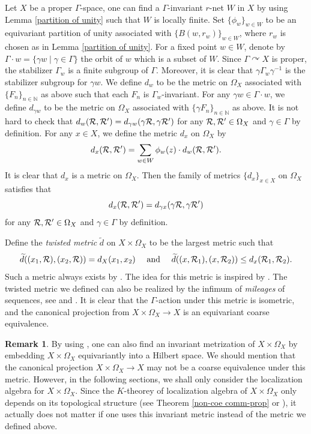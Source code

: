 \documentclass[11pt]{article}
\theoremstyle{definition}
\newtheorem{Rem}[Def]{Remark}
\theoremstyle{plain}
\def\IN{\mathbb N}\def\IR{\mathbb R}\def\IE{\mathbb E}\def\IC{\mathbb C}\def\IL{\mathbb L}\def\IQ{\mathbb Q}\def\IA{\mathbb A}\def\IZ{\mathbb Z}
\def\wt{\widetilde}
\def\Ga{\Gamma}
\def\car{\curvearrowright}
\begin{document}
Let $X$ be a proper $\Ga$-space, one can find a $\Ga$-invariant $r$-net $W$ in $X$ by using Lemma \ref{partition of unity} such that $W$ is locally finite. Set $\{\phi_w\}_{w\in W}$ to be an equivariant partition of unity associated with $\{B(w,r_w)\}_{w\in W}$, where $r_w$ is chosen as in Lemma \ref{partition of unity}. For a fixed point $w\in W$, denote by $\Ga\cdot w=\{\gamma w\mid \gamma\in\Ga\}$ the orbit of $w$ which is a subset of $W$. Since $\Ga\car X$ is proper, the stabilizer $\Ga_w$ is a finite subgroup of $\Ga$. Moreover, it is clear that $\gamma\Ga_w\gamma^{-1}$ is the stabilizer subgroup for $\gamma w$. We define $d_w$ to be the metric on $\Omega_X$ associated with $\{F_n\}_{n\in\IN}$ as above such that each $F_n$ is $\Ga_w$-invariant. For any $\gamma w\in\Ga\cdot w$, we define $d_{\gamma w}$ to be the metric on $\Omega_X$ associated with $\{\gamma F_n\}_{n\in\IN}$ as above. It is not hard to check that $d_w(\mathcal R,\mathcal R')=d_{\gamma w}(\gamma\mathcal R,\gamma\mathcal R')$ for any $\mathcal R,\mathcal R'\in\Omega_X$ and $\gamma\in\Ga$ by definition. For any $x\in X$, we define the metric $d_x$ on $\Omega_{X}$ by
$$d_x(\mathcal R,\mathcal R')=\sum_{w\in W}\phi_w(z)\cdot d_w(\mathcal R,\mathcal R').$$
It is clear that $d_x$ is a metric on $\Omega_X$. Then the family of metrics $\{d_x\}_{x\in X}$ on $\Omega_X$ satisfies that
$$d_x(\mathcal R,\mathcal R')=d_{\gamma x}(\gamma\mathcal R,\gamma\mathcal R')$$
for any $\mathcal R,\mathcal R'\in\Omega_X$ and $\gamma\in\Ga$ by definition.

Define the \emph{twisted metric} $\wt d$ on $X\times\Omega_X$ to be the largest metric such that
$$\wt d((x_1,\R),(x_2,\R))=d_X(x_1,x_2)\quad\text{ and }\quad\wt d((x,\R_1),(x,\R_2))\leq d_x(\R_1,\R_2).$$
Such a metric always exists by \cite[Lemma 1.4]{Roe2005}. The idea for this metric is inspired by \cite[Definition 3.6]{SW2021}. The twisted metric we defined can also be realized by the infimum of \emph{mileages} of sequences, see \cite[Proposition 1.6]{Roe2005} and \cite[Proposition 3.7]{SW2021}. It is clear that the $\Ga$-action under this metric is isometric, and the canonical projection from $X\times\Omega_X\to X$ is an equivariant coarse equivalence.

\begin{Rem}\label{metric on product space}
By using \cite[Theorem 4.3.4]{metrizationGaspace}, one can also find an invariant metrization of $X\times\Omega_X$ by embedding $X\times\Omega_X$ equivariantly into a Hilbert space. We should mention that the canonical projection $X\times\Omega_X\to X$ may not be a coarse equivalence under this metric. However, in the following sections, we shall only consider the localization algebra for $X\times\Omega_X$. Since the $K$-theorey of localization algebra of $X\times\Omega_X$ only depends on its topological structure (see Theorem \ref{non-coe comm-prop} or \cite[Theorem 6.6.2]{HIT2020}), it actually does not matter if one uses this invariant metric instead of the metric we defined above.
\end{Rem}
\end{document}
